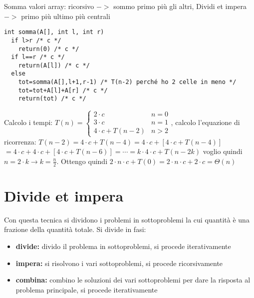\documentclass[a4paper,12pt,oneside,tikz]{book}
\begin{document}
\newpage
\begin{esercizio}
Somma valori array:
ricorsivo $->$ sommo primo più gli altri, Dividi et impera $->$ primo più ultimo più centrali
\begin{verbatim}
int somma(A[], int l, int r)
  if l>r /* c */
    return(0) /* c */
  if l==r /* c */
    return(A[l]) /* c */
  else
    tot=somma(A[],l+1,r-1) /* T(n-2) perché ho 2 celle in meno */
    tot=tot+A[l]+A[r] /* c */
    return(tot) /* c */   
\end{verbatim}
Calcolo i tempi:
$T(n)=\begin{cases}
2\cdot c & n=0\\
3\cdot c	 & n=1\\
4\cdot c+ T(n-2) & n>2
\end{cases}$, calcolo l'equazione di ricorrenza: $T(n-2)=4\cdot c+T(n-4)= 4\cdot c +\left[4\cdot c + T(n-4)\right]$\\$= 4\cdot c + 4\cdot c+\left[4\cdot c + T(n-6)\right]=\cdots=k\cdot 4\cdot c+T(n-2k)$ voglio quindi $n=2\cdot k\rightarrow k=\frac{n}{2}$. Ottengo quindi $2\cdot n\cdot c+T(0)= 2\cdot n\cdot c +2\cdot c=\Theta(n)$
\end{esercizio}
\section{Divide et impera}
Con questa tecnica si dividono i problemi in sottoproblemi la cui quantità è una frazione della quantità totale. Si divide in fasi:
\begin{itemize}
\item \textbf{divide:} divido il problema in sottoproblemi, si procede iterativamente
\item \textbf{impera:} si risolvono i vari sottoproblemi, si procede ricorsivamente
\item \textbf{combina:} combino le soluzioni dei vari sottoproblemi per dare la risposta al problema principale, si procede iterativamente
\end{itemize}
\end{document}
